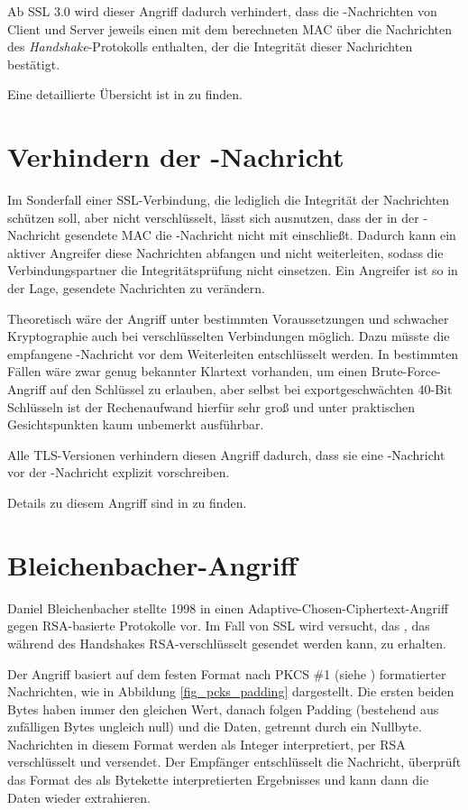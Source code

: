 Ab SSL 3.0 wird dieser Angriff dadurch verhindert, dass die \finished{}-Nachrichten von Client und Server jeweils einen mit dem \mastersecret{} berechneten MAC über die Nachrichten des \emph{Handshake}-Protokolls enthalten, der die Integrität dieser Nachrichten bestätigt.

Eine detaillierte Übersicht ist in \cite{wagner96} zu finden.

\section{Verhindern der \changecipherspec{}-Nachricht}

Im Sonderfall einer SSL-Verbindung, die lediglich die Integrität der Nachrichten schützen soll, aber nicht verschlüsselt, lässt sich ausnutzen, dass der in der \finished{}-Nachricht gesendete MAC die \changecipherspec{}-Nachricht nicht mit einschließt. Dadurch kann ein aktiver Angreifer diese Nachrichten abfangen und nicht weiterleiten, sodass die Verbindungspartner die Integritätsprüfung nicht einsetzen. Ein Angreifer ist so in der Lage, gesendete Nachrichten zu verändern. 

Theoretisch wäre der Angriff unter bestimmten Voraussetzungen und schwacher Kryptographie auch bei verschlüsselten Verbindungen möglich. Dazu müsste die empfangene \finished{}-Nachricht vor dem Weiterleiten entschlüsselt werden. In bestimmten Fällen wäre zwar genug bekannter Klartext vorhanden, um einen Brute-Force-Angriff auf den Schlüssel zu erlauben, aber selbst bei exportgeschwächten 40-Bit Schlüsseln ist der Rechenaufwand hierfür sehr groß und unter praktischen Gesichtspunkten kaum unbemerkt ausführbar.

Alle TLS-Versionen verhindern diesen Angriff dadurch, dass sie eine \changecipherspec{}-Nachricht vor der \finished{}-Nachricht explizit vorschreiben.

Details zu diesem Angriff sind in \cite{wagner96} zu finden.

\section{Bleichenbacher-Angriff}

Daniel Bleichenbacher stellte 1998 in \cite{bleichenbacher98} einen Adaptive-Chosen-Ciphertext-Angriff gegen RSA-basierte Protokolle vor. Im Fall von SSL wird versucht, das \premastersecret{}, das während des Handshakes RSA-verschlüsselt gesendet werden kann, zu erhalten.

Der Angriff basiert auf dem festen Format nach PKCS \#1 (siehe \cite{pkcs1}) formatierter Nachrichten, wie in Abbildung \ref{fig_pcks_padding} dargestellt. Die ersten beiden Bytes haben immer den gleichen Wert, danach folgen Padding (bestehend aus zufälligen Bytes ungleich null) und die Daten, getrennt durch ein Nullbyte. Nachrichten in diesem Format werden als Integer interpretiert, per RSA verschlüsselt und versendet. Der Empfänger entschlüsselt die Nachricht, überprüft das Format des als Bytekette interpretierten Ergebnisses und kann dann die Daten wieder extrahieren.

